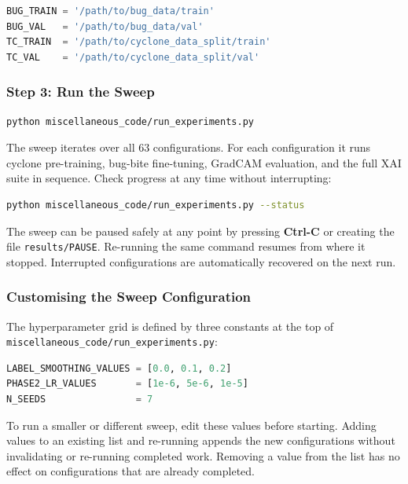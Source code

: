 \documentclass[12pt,a4paper]{article}
\begin{document}
\begin{lstlisting}[language=Python]
BUG_TRAIN = '/path/to/bug_data/train'
BUG_VAL   = '/path/to/bug_data/val'
TC_TRAIN  = '/path/to/cyclone_data_split/train'
TC_VAL    = '/path/to/cyclone_data_split/val'
\end{lstlisting}

\subsubsection{Step 3: Run the Sweep}

\begin{lstlisting}[language=bash]
python miscellaneous_code/run_experiments.py
\end{lstlisting}

The sweep iterates over all 63 configurations. For each configuration it
runs cyclone pre-training, bug-bite fine-tuning, GradCAM evaluation, and
the full XAI suite in sequence. Check progress at any time without
interrupting:

\begin{lstlisting}[language=bash]
python miscellaneous_code/run_experiments.py --status
\end{lstlisting}

The sweep can be paused safely at any point by pressing \textbf{Ctrl-C}
or creating the file \texttt{results/PAUSE}. Re-running the same command
resumes from where it stopped. Interrupted configurations are automatically
recovered on the next run.

\subsubsection{Customising the Sweep Configuration}

The hyperparameter grid is defined by three constants at the top of
\texttt{miscellaneous\_code/run\_experiments.py}:

\begin{lstlisting}[language=Python]
LABEL_SMOOTHING_VALUES = [0.0, 0.1, 0.2]
PHASE2_LR_VALUES       = [1e-6, 5e-6, 1e-5]
N_SEEDS                = 7
\end{lstlisting}

To run a smaller or different sweep, edit these values before starting.
Adding values to an existing list and re-running appends the new
configurations without invalidating or re-running completed work. Removing
a value from the list has no effect on configurations that are already
completed.
\end{document}
